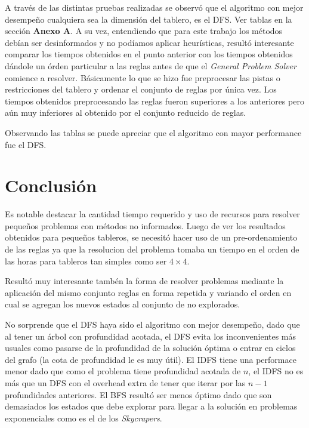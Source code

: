 \documentclass[%
    final,
    reprint,
    notitlepage,
    narroweqnarray,
    inline,
    twoside,
    invited
    ]{ieee}
\begin{document}
\par A través de las distintas pruebas realizadas se observó que el algoritmo con mejor desempeño cualquiera sea la dimensión del tablero, es el DFS. Ver tablas en la sección \textbf{Anexo A}. A su vez, entendiendo que para este trabajo los métodos debían ser desinformados y no podíamos aplicar heurísticas,  resultó interesante comparar los tiempos obtenidos en el punto anterior con los tiempos obtenidos dándole un órden particular a las reglas antes de que el \textit{General Problem Solver} comience a resolver. Básicamente lo que se hizo fue preprocesar las pistas o restricciones del tablero y ordenar el conjunto de reglas por única vez. Los tiempos obtenidos preprocesando las reglas fueron superiores a los anteriores pero aún muy inferiores al obtenido por el conjunto reducido de reglas.

\par Observando las tablas se puede apreciar que el algoritmo con mayor performance fue el DFS.

\section{Conclusión}

\PARstart Es notable destacar la cantidad tiempo requerido y uso de recursos para resolver pequeños problemas con métodos no informados. Luego de ver los resultados obtenidos para pequeños tableros, se necesitó hacer uso de un pre-ordenamiento de las reglas ya que la resolucion del problema tomaba un tiempo en el orden de las horas para tableros tan simples como ser $4\times4$.\\

\par Resultó muy interesante tambén la forma de resolver problemas mediante la aplicación del mismo conjunto reglas en forma repetida y variando el orden en cual se agregan los nuevos estados al conjunto de no explorados.

\par No sorprende que el DFS haya sido el algoritmo con mejor desempeño, dado que al tener un árbol con profundidad acotada, el DFS evita los inconvenientes más usuales como pasarse de la profundidad de la solución óptima o entrar en ciclos del grafo (la cota de profundidad le es muy útil). El IDFS tiene una performace menor dado que como el problema tiene profundidad acotada de $n$, el IDFS no es más que un DFS con el overhead extra de tener que iterar por las $n-1$ profundidades anteriores. El BFS resultó ser menos óptimo dado que son demasiados los estados que debe explorar para llegar a la solución en problemas exponenciales como es el de los \textit{Skycrapers}. 
\end{document}
